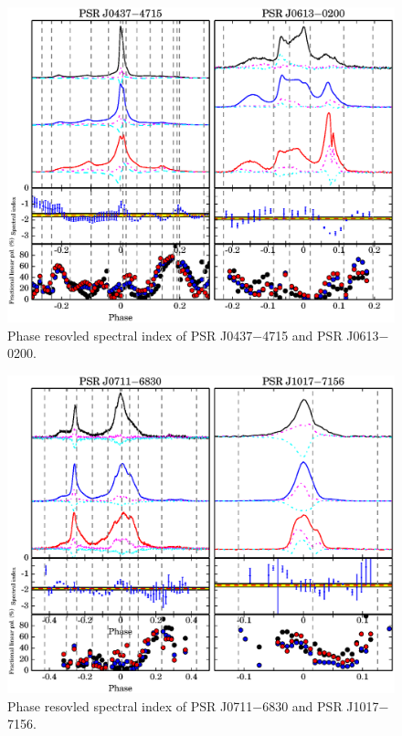 \documentclass[useAMS,usenatbib]{mn2e}
\begin{document}
\begin{figure}
\begin{center}
\includegraphics[width=7 in]{0437_0613SI.ps}
\caption{Phase resovled spectral index of PSR J0437$-$4715 and PSR J0613$-$0200.} 
\label{0437si}
\end{center}
\end{figure}

\begin{figure}
\begin{center}
\includegraphics[width=7 in]{0711_1017SI.ps}
\caption{Phase resovled spectral index of PSR J0711$-$6830 and PSR J1017$-$7156.} 
\label{0711si}
\end{center}
\end{figure}
\end{document}
